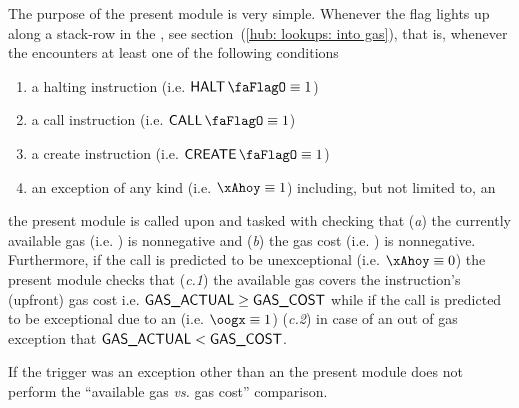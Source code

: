 The purpose of the present \gasMod{} module is very simple.
Whenever the \CONTEXTMAYCHANGE{} flag lights up along a stack-row in the \hubMod{},
see section~(\ref{hub: lookups: into gas}), that is, whenever the \hubMod{} encounters at least one of the following conditions
\begin{enumerate}
	\item a halting instruction (i.e. $\haltFlag \equiv 1$)
        \item a call instruction (i.e. $\callFlag \equiv 1$)
        \item a create instruction (i.e. $\createFlag \equiv 1$)
	\item an exception of any kind (i.e. $\xAhoy \equiv 1$) including, but not limited to, an \oogxSH{}
\end{enumerate}
the present module is called upon and tasked with checking that
(\emph{a}) the currently available gas (i.e. \gasActual{}) is nonnegative and
(\emph{b}) the gas cost (i.e. \gasActual{}) is nonnegative. 
Furthermore, if the call is predicted to be unexceptional (i.e. $\xAhoy \equiv 0$) the present module checks that
(\emph{c.1}) the available gas covers the instruction's (upfront) gas cost i.e. $\textsf{GAS}\textsf{\_ACTUAL} \geq \textsf{GAS}\textsf{\_COST}$ while
if the call is predicted to be exceptional due to an \oogxSH{} (i.e. $\oogx \equiv 1$) 
(\emph{c.2}) in case of an out of gas exception that $\textsf{GAS}\textsf{\_ACTUAL} < \textsf{GAS}\textsf{\_COST}$.

\saNote{} If the trigger was an exception other than an \oogxSH{} the present module does not perform the ``available gas \emph{vs.} gas cost'' comparison.
